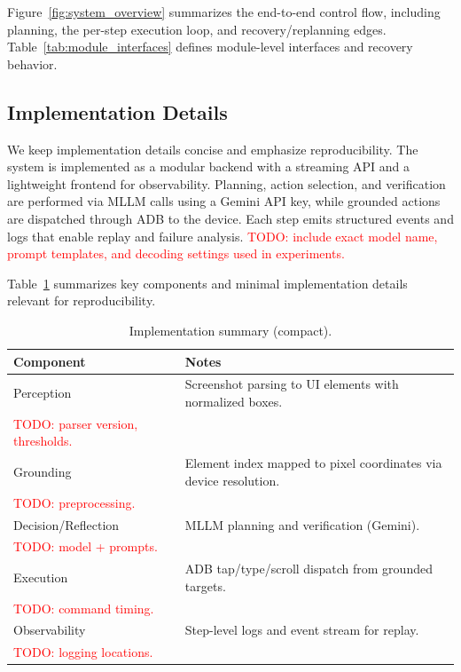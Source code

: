 Figure~\ref{fig:system_overview} summarizes the end-to-end control flow, including planning, the per-step execution loop, and recovery/replanning edges. Table~\ref{tab:module_interfaces} defines module-level interfaces and recovery behavior.


\subsection{Implementation Details}
We keep implementation details concise and emphasize reproducibility. The system is implemented as a modular backend with a streaming API and a lightweight frontend for observability. Planning, action selection, and verification are performed via MLLM calls using a Gemini API key, while grounded actions are dispatched through ADB to the device. Each step emits structured events and logs that enable replay and failure analysis. \textcolor{red}{TODO: include exact model name, prompt templates, and decoding settings used in experiments.}

Table~\ref{tab:impl_summary} summarizes key components and minimal implementation details relevant for reproducibility.

\begin{table}[t]
  \centering
  \small
  \caption{Implementation summary (compact).}
  \label{tab:impl_summary}
  \renewcommand{\arraystretch}{1.1}
  \setlength{\tabcolsep}{6pt}
  \begin{tabularx}{\linewidth}{@{}lX@{}}
    \toprule
    \textbf{Component} & \textbf{Notes} \\
    \midrule
    Perception & Screenshot parsing to UI elements with normalized boxes. \\ \textcolor{red}{TODO: parser version, thresholds.} \\
    Grounding & Element index mapped to pixel coordinates via device resolution. \\ \textcolor{red}{TODO: preprocessing.} \\
    Decision/Reflection & MLLM planning and verification (Gemini). \\ \textcolor{red}{TODO: model + prompts.} \\
    Execution & ADB tap/type/scroll dispatch from grounded targets. \\ \textcolor{red}{TODO: command timing.} \\
    Observability & Step-level logs and event stream for replay. \\ \textcolor{red}{TODO: logging locations.} \\
    \bottomrule
  \end{tabularx}
\end{table}
